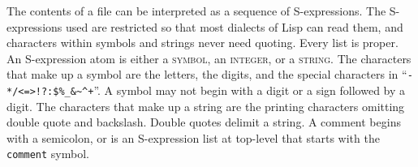 The contents of a file can be interpreted as a sequence of
S-expressions.  The S-expressions used are restricted so that most
dialects of Lisp can read them, and characters within symbols and
strings never need quoting.  Every list is proper.  An S-expression
atom is either a \textsc{symbol}, an \textsc{integer}, or
a \textsc{string}.  The characters that make up a symbol are the
letters, the digits, and the special characters in
``\verb|-*/<=>!?:$%_&~^+|''.  A symbol may not begin with a digit or a
sign followed by a digit.  The characters that make up a string are
the printing characters omitting double quote and backslash.  Double
quotes delimit a string.  A comment begins with a
semicolon, or is an S-expression list at top-level that starts with
the \texttt{comment} symbol.
